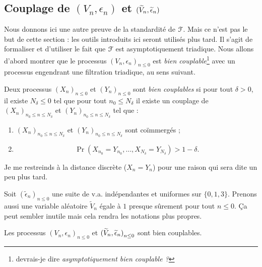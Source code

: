 \documentclass[12pt,a4paper]{article}
\begin{document}
\subsection{Couplage de $(V_n,\epsilon_n)$ et $(\widetilde{V}_n, \widetilde{\epsilon}_n)$}

Nous donnons ici une autre preuve de la standardité de $\EuScript{F}$. 
Mais ce n'est pas le but de cette section : 
les outils introduits ici seront utilisés plus tard.  
Il s'agit de formaliser et d'utiliser le fait que $\EuScript{F}$ est asymptotiquement 
triadique. 
Nous allons d'abord montrer que le processus ${(V_n, \epsilon_n)}_{n \leq 0}$ 
est \emph{bien couplable}\footnote{devrais-je dire \emph{asymptotiquement bien couplable ?}} 
avec un processus engendrant une filtration triadique, 
au sens suivant.

\begin{definition}
Deux processus  ${(X_n)}_{n \leq 0}$ et ${(Y_n)}_{n \leq 0}$ sont \emph{bien couplables}  
si pour tout $\delta >0$, il existe $N_\delta \leq 0$ tel que pour tout $n_0 \leq N_\delta$ il existe un couplage de 
${(X_n)}_{n_0 \leq n \leq N_\delta}$ et ${(Y_n)}_{n_0 \leq n \leq N_\delta}$ tel que :
\begin{enumerate}
\item ${(X_n)}_{n_0 \leq n \leq N_\delta}$ et ${(Y_n)}_{n_0 \leq n \leq N_\delta}$ 
sont co\"immergés ; 

\item 
$$
\Pr(X_{n_0}=Y_{n_0}, \ldots, X_{N_\delta}=Y_{N_\delta}) > 1-\delta. 
$$
\end{enumerate} 
\end{definition}

\begin{remarque}
Je me restreinds à la distance discrète ($X_n=Y_n$) pour une raison qui sera 
dite un peu plus tard.
\end{remarque}

Soit ${(\widetilde{\epsilon}_n)}_{n \leq 0}$ une suite de v.a. indépendantes 
et uniformes sur $\{0,1,3\}$. 
 Prenons aussi une variable aléatoire $\widetilde{V}_n$ égale à $1$ 
presque sûrement pour tout $n \leq 0$. Ça peut sembler inutile mais 
cela rendra les notations plus propres. 

\begin{lemme}\label{lemme:joining_epsilon}
Les processus 
${(V_n, \epsilon_n)}_{n \leq 0}$ et 
 ${(\widetilde{V}_n, \widetilde{\epsilon}_n)}_{n \leq 0}$ sont bien couplables. 
\end{lemme}
\end{document}
